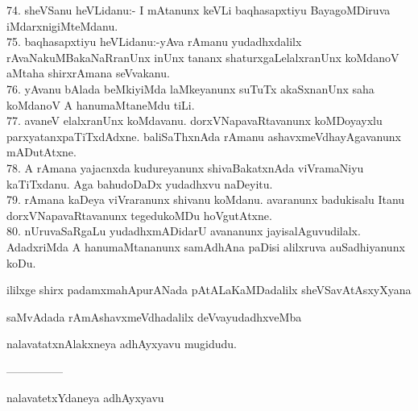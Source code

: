 \documentclass{article}
\begin{document}
74. sheVSanu heVLidanu:- I mAtanunx keVLi baqhasapxtiyu BayagoMDiruva iMdarxnigiMteMdanu.\\
75. baqhasapxtiyu heVLidanu:-yAva rAmanu yudadhxdalilx rAvaNakuMBakaNaRranUnx inUnx tananx shaturxgaLelalxranUnx koMdanoV aMtaha shirxrAmana seVvakanu.\\
76. yAvanu bAlada beMkiyiMda laMkeyanunx suTuTx akaSxnanUnx saha koMdanoV A hanumaMtaneMdu tiLi.\\
77. avaneV elalxranUnx koMdavanu. dorxVNapavaRtavanunx koMDoyayxlu parxyatanxpaTiTxdAdxne. baliSaThxnAda rAmanu ashavxmeVdhayAgavanunx mADutAtxne.\\
78. A rAmana yajacnxda kudureyanunx shivaBakatxnAda viVramaNiyu kaTiTxdanu. Aga bahudoDaDx yudadhxvu naDeyitu.\\
79. rAmana kaDeya viVraranunx shivanu koMdanu. avaranunx badukisalu Itanu dorxVNapavaRtavanunx tegedukoMDu hoVgutAtxne.\\
80. nUruvaSaRgaLu yudadhxmADidarU avananunx jayisalAguvudilalx. AdadxriMda A hanumaMtananunx samAdhAna paDisi alilxruva auSadhiyanunx koDu.

\begin{center}
ililxge shirx padamxmahApurANada pAtALaKaMDadalilx sheVSavAtAsxyXyana
\end{center}

\begin{center}
saMvAdada rAmAshavxmeVdhadalilx deVvayudadhxveMba
\end{center}

\begin{center}
nalavatatxnAlakxneya adhAyxyavu mugidudu.
\end{center}

\begin{center}
---------------
\end{center}

\begin{center}
nalavatetxYdaneya adhAyxyavu
\end{center}
\end{document}
